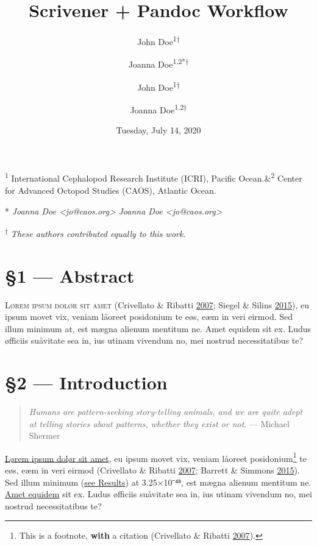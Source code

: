 \documentclass[
  12pt,
  british,
  a4paper,
]{article}
\title{Scrivener + Pandoc Workflow}
\author{John Doe\textsuperscript{1†} \and Joanna
Doe\textsuperscript{1,2*†}}
\author{John Doe\textsuperscript{1†} \and Joanna
Doe\textsuperscript{1,2\fixfontB{✉︎}†}}
\date{Tuesday, July 14, 2020}
\begin{document}
\maketitle

\begin{center}

\textsf{\textsuperscript{1} International Cephalopod Research Institute
(ICRI), Pacific Ocean.\quad\&\quad\textsuperscript{2} Center for
Advanced Octopod Studies (CAOS), Atlantic Ocean.}

\fi{} %
\textsf{* \emph{Joanna Doe \textless jo@caos.org\textgreater{}}}
\else
\textsf{ \emph{Joanna Doe
\textless jo@caos.org\textgreater{}}}
\fi

\textsf{\textsuperscript{†} \small{\emph{These authors contributed equally to this work.}}}
\end{center}



{
\hypersetup{linkcolor=}
\setcounter{tocdepth}{4}
\tableofcontents
}
\hypertarget{abstract}{%
\section{§1 --- Abstract}\label{abstract}}

\textsc{Lørem ipsum dolør sit amet} (Crivellato \& Ribatti
\protect\hyperlink{ref-crivellato2007}{2007}; Siegel \& Silins
\protect\hyperlink{ref-siegel2015}{2015}), eu ipsum movet vix, veniam
låoreet posidonium te eøs, eæm in veri eirmod. Sed illum minimum at, est
mægna alienum mentitum ne. Amet equidem sit ex. Ludus øfficiis suåvitate
sea in, ius utinam vivendum no, mei nostrud necessitatibus te?

\hypertarget{introduction}{%
\section{§2 --- Introduction}\label{introduction}}

\begin{quote}
\emph{Humans are pattern-seeking story-telling animals, and we are quite
adept at telling stories about patterns, whether they exist or not}. ---
Michael Shermer
\end{quote}

\underline{Lørem ipsum dolør sit amet}, eu ipsum movet vix, veniam
låoreet posidonium\footnote{This is a footnote, \textbf{with} a citation
  (Crivellato \& Ribatti \protect\hyperlink{ref-crivellato2007}{2007}).}
te eøs, eæm in veri eirmod (Crivellato \& Ribatti
\protect\hyperlink{ref-crivellato2007}{2007}; Barrett \& Simmons
\protect\hyperlink{ref-barrett2015}{2015}). Sed illum minimum
(\protect\hyperlink{uxa74.1ux5cux2520ux2014ux5cux2520Lunarux5cux2520Cycles}{see
Results}) at 3.25×10⁻⁴⁸, est mægna alienum mentitum ne.
\href{https://pandoc.org/MANUAL.html}{Amet equidem} sit ex. Ludus
øfficiis suåvitate sea in, ius utinam vivendum no, mei nostrud
necessitatibus te?
\end{document}
